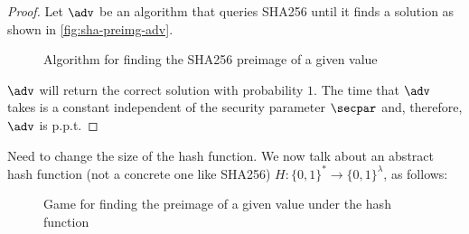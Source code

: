 \begin{proof}
  Let $\adv$ be an algorithm that queries SHA256 until it finds a solution as shown in \autoref{fig:sha-preimg-adv}.
  \begin{figure}[tbhp]
  \begin{center}
    \begin{tcolorbox}[width=5cm]
      \begin{pchstack}[center]
      \end{pchstack}
    \end{tcolorbox}
  \end{center}
  \caption{Algorithm for finding the SHA256 preimage of a given value \label{fig:sha-preimg-adv}}
  \end{figure}
  $\adv$ will return the correct solution with probability $1$.
  The time that $\adv$ takes is a constant independent of the security parameter $\secpar$ and, therefore, $\adv$ is p.p.t.
\end{proof}



Need to change the size of the hash function.
We now talk about an abstract hash function (not a concrete one like SHA256) $H: \{0, 1\}^* \rightarrow \{0, 1\}^\lambda$, as follows:

\begin{figure}[tbhp]
  \begin{center}
    \begin{tcolorbox}[width=5cm]
      \begin{pchstack}[center]
      \end{pchstack}
    \end{tcolorbox}
  \end{center}
  \caption{Game for finding the preimage of a given value under the hash function \label{fig:break-hash}}
\end{figure}

